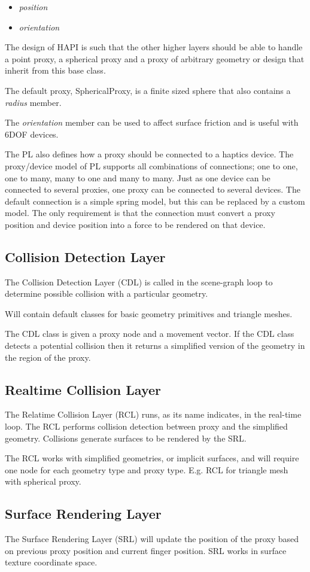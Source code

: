 \begin{itemize}
\item {\it position}
\item {\it orientation}
\end{itemize}

The design of HAPI is such that the other higher layers should be able
to handle a point proxy, a spherical proxy and a proxy of arbitrary
geometry or design that inherit from this base class.

The default proxy, SphericalProxy, is a finite sized sphere that also
contains a {\it radius} member.

The {\it orientation} member can be used to affect surface friction
and is useful with 6DOF devices.

The PL also defines how a proxy should be connected to a haptics
device. The proxy/device model of PL supports all combinations of
connections; one to one, one to many, many to one and many to
many. Just as one device can be connected to several proxies, one
proxy can be connected to several devices. The default connection is a
simple spring model, but this can be replaced by a custom model. The
only requirement is that the connection must convert a proxy position
and device position into a force to be rendered on that device.


\subsection{Collision Detection Layer}
The Collision Detection Layer (CDL) is called in the scene-graph loop
to determine possible collision with a particular geometry.

Will contain default classes for basic geometry primitives and
triangle meshes.

The CDL class is given a proxy node and a movement vector. If the CDL
class detects a potential collision then it returns a simplified
version of the geometry in the region of the proxy.


\subsection{Realtime Collision Layer}

The Relatime Collision Layer (RCL) runs, as its name indicates, in the
real-time loop. The RCL performs collision detection between proxy and
the simplified geometry. Collisions generate surfaces to be rendered
by the SRL.

The RCL works with simplified geometries, or implicit surfaces, and
will require one node for each geometry type and proxy
type. E.g. RCL for triangle mesh with spherical proxy.


\subsection{Surface Rendering Layer}
The Surface Rendering Layer (SRL) will update the position of the
proxy based on previous proxy position and current finger
position. SRL works in surface texture coordinate space.





 


